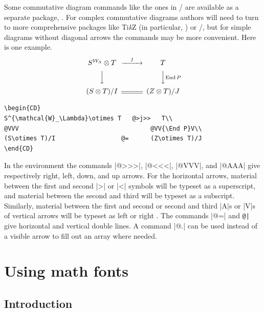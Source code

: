 \documentclass[leqno,titlepage,openany]{amsldoc}[1999/12/13]
\def\tikz/{Ti\textit{k}Z}
\DeclareMathOperator{\End}{End}
\begin{document}
Some commutative diagram commands like the ones in \amstex/ are
available as a separate package, . For complex commutative
diagrams authors will need to turn to more comprehensive packages like
\tikz/\index{TikZ@\tikz/ package} (in particular, )
or \xypic/,
but for simple diagrams without diagonal
arrows the  commands
may be more convenient. Here is one example.
\begin{equation*}
\begin{CD}
S^{\mathcal{W}_\Lambda}\otimes T   @>j>>   T\\
@VVV                                    @VV{\End P}V\\
(S\otimes T)/I                  @=      (Z\otimes T)/J
\end{CD}
\end{equation*}
\begin{verbatim}
\begin{CD}
S^{\mathcal{W}_\Lambda}\otimes T   @>j>>   T\\
@VVV                                    @VV{\End P}V\\
(S\otimes T)/I                  @=      (Z\otimes T)/J
\end{CD}
\end{verbatim}
In the  environment the commands |@>>>|,
|@<<<|, |@VVV|, and |@AAA| give respectively right, left, down, and up
arrows. For the horizontal arrows, material between the first and second
|>| or |<| symbols will be typeset as a superscript, and material
between the second and third will be typeset as a subscript. Similarly,
material between the first and second or second and third |A|s or |V|s
of vertical arrows will be typeset as left or right .
The commands |@=| and \verb'@|' give horizontal and vertical double lines.
A  command |@.| can be used instead of a visible arrow
to fill out an array where needed.


\chapter{Using math fonts}

\section{Introduction}
\end{document}
